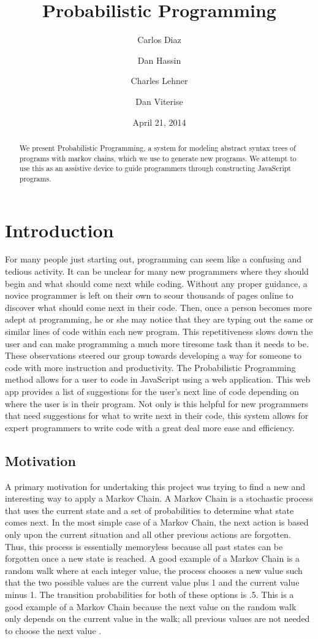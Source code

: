 \documentclass{article}
\title{
Probabilistic Programming
}
\author{
	Carlos Diaz
	\and
	Dan Hassin
	\and
	Charles Lehner
	\and
	Dan Viterise
}
\date{April 21, 2014}
\begin{document}
\maketitle

\begin{abstract}
	We present Probabilistic Programming, a system for modeling abstract syntax
	trees of programs with markov chains, which we use to generate new programs.
	We attempt to use this as an assistive device to guide programmers through
	constructing JavaScript programs.
\end{abstract}

\section{Introduction}
For many people just starting out, programming can seem like a confusing and tedious activity. It can be unclear for 
many new programmers where they should begin and what should come next while coding. Without any proper guidance, 
a novice programmer is left on their own to scour thousands of pages online to discover what should come next in 
their code. Then, once a person becomes more adept at programming, he or she may notice that they are typing out 
the same or similar lines of code within each new program. This repetitiveness slows down the user and can make 
programming a much more tiresome task than it needs to be. These observations steered our group towards developing
a way for someone to code with more instruction and productivity. The Probabilistic Programming method allows for a user to code in JavaScript
using a web application. This web app provides a list of suggestions for the user's next line of code depending on where
the user is in their program. Not only is this helpful for new programmers that need suggestions for what to write next 
in their code, this system allows for expert programmers to write code with a great deal more ease and efficiency.

\subsection{Motivation}

A primary motivation for undertaking this project was trying to find a new and interesting way to apply a Markov Chain.
A Markov Chain is a stochastic process that uses the current state and a set of probabilities to determine what 
state comes next. In the most simple case of a Markov Chain, the next action is based only upon the current situation
and all other previous actions are forgotten. Thus, this process is essentially memoryless because all past states can
be forgotten once a new state is reached. A good example of a Markov Chain is a random walk where at each integer value,
the process chooses a new value such that the two possible values are the current value plus 1 and the current value
minus 1. The transition probabilities for both of these options is .5. This is a good example of a Markov Chain because
the next value on the random walk only depends on the current value in the walk; all previous values are not needed 
to choose the next value \cite{markov}. 
\end{document}
